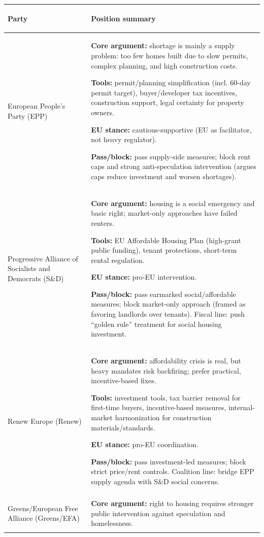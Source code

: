 \documentclass[10pt,a4paper]{article}
\begin{document}
\small
\renewcommand{\arraystretch}{1.12}
\begin{tabularx}{\textwidth}{>{\bfseries\raggedright\arraybackslash}p{3.2cm} >{\raggedright\arraybackslash}X}
\toprule
Party & Position summary \\
\midrule
European People's Party (EPP) & {\raggedright\textbf{Core argument:} shortage is mainly a supply problem: too few homes built due to slow permits, complex planning, and high construction costs.\par
\textbf{Tools:} permit/planning simplification (incl. 60-day permit target), buyer/developer tax incentives, construction support, legal certainty for property owners.\par
\textbf{EU stance:} cautious-supportive (EU as facilitator, not heavy regulator).\par
\textbf{Pass/block:} pass supply-side measures; block rent caps and strong anti-speculation intervention (argues caps reduce investment and worsen shortages).} \\
\midrule
Progressive Alliance of Socialists and Democrats (S\&D) & {\raggedright\textbf{Core argument:} housing is a social emergency and basic right; market-only approaches have failed renters.\par
\textbf{Tools:} EU Affordable Housing Plan (high-grant public funding), tenant protections, short-term rental regulation.\par
\textbf{EU stance:} pro-EU intervention.\par
\textbf{Pass/block:} pass earmarked social/affordable measures; block market-only approach (framed as favoring landlords over tenants). Fiscal line: push ``golden rule'' treatment for social housing investment.} \\
\midrule
Renew Europe (Renew) & {\raggedright\textbf{Core argument:} affordability crisis is real, but heavy mandates risk backfiring; prefer practical, incentive-based fixes.\par
\textbf{Tools:} investment tools, tax barrier removal for first-time buyers, incentive-based measures, internal-market harmonization for construction materials/standards.\par
\textbf{EU stance:} pro-EU coordination.\par
\textbf{Pass/block:} pass investment-led measures; block strict price/rent controls. Coalition line: bridge EPP supply agenda with S\&D social concerns.} \\
\midrule
Greens/European Free Alliance (Greens/EFA) & {\raggedright\textbf{Core argument:} right to housing requires stronger public intervention against speculation and homelessness.\par
}
\end{tabularx}
\end{document}
